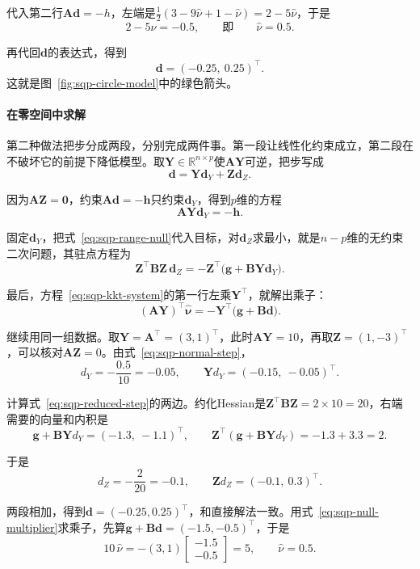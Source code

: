 代入第二行$\bm{A}\bm{d}=-h$，左端是$\frac12(3-9\hat\nu+1-\hat\nu)=2-5\hat\nu$，于是
\[
 2-5\hat\nu=-0.5,\qquad\text{即}\qquad\hat\nu=0.5.
\]

再代回$\bm{d}$的表达式，得到
\[
 \bm{d}=(-0.25,\ 0.25)^\top.
\]
这就是图~\ref{fig:sqp-circle-model}中的绿色箭头。

\paragraph{在零空间中求解}
第二种做法把步分成两段，分别完成两件事。第一段让线性化约束成立，第二段在不破坏它的前提下降低模型。取$\bm{Y}\in\mathbb{R}^{n\times p}$使$\bm{A}\bm{Y}$可逆，把步写成
\begin{equation}
 \bm{d}=\bm{Y}\bm{d}_Y+\bm{Z}\bm{d}_Z.
 \label{eq:sqp-range-null}
\end{equation}

因为$\bm{A}\bm{Z}=\bm{0}$，约束$\bm{A}\bm{d}=-\bm{h}$只约束$\bm{d}_Y$，得到$p$维的方程
\begin{equation}
 \bm{A}\bm{Y}\bm{d}_Y=-\bm{h}.
 \label{eq:sqp-normal-step}
\end{equation}

固定$\bm{d}_Y$，把式~\eqref{eq:sqp-range-null}代入目标，对$\bm{d}_Z$求最小，就是$n-p$维的无约束二次问题，其驻点方程为
\begin{equation}
 \bm{Z}^\top\bm{B}\bm{Z}\,\bm{d}_Z=-\bm{Z}^\top\bigl(\bm{g}+\bm{B}\bm{Y}\bm{d}_Y\bigr).
 \label{eq:sqp-reduced-step}
\end{equation}

最后，方程~\eqref{eq:sqp-kkt-system}的第一行左乘$\bm{Y}^\top$，就解出乘子：
\begin{equation}
 (\bm{A}\bm{Y})^\top\hat{\bm{\nu}}=-\bm{Y}^\top\bigl(\bm{g}+\bm{B}\bm{d}\bigr).
 \label{eq:sqp-null-multiplier}
\end{equation}

继续用同一组数据。取$\bm{Y}=\bm{A}^\top=(3,1)^\top$，此时$\bm{A}\bm{Y}=10$，再取$\bm{Z}=(1,-3)^\top$，可以核对$\bm{A}\bm{Z}=0$。由式~\eqref{eq:sqp-normal-step}，
\[
 d_Y=-\frac{0.5}{10}=-0.05,\qquad \bm{Y}d_Y=(-0.15,\ -0.05)^\top.
\]

计算式~\eqref{eq:sqp-reduced-step}的两边。约化Hessian是$\bm{Z}^\top\bm{B}\bm{Z}=2\times10=20$，右端需要的向量和内积是
\[
 \bm{g}+\bm{B}\bm{Y}d_Y=(-1.3,\ -1.1)^\top,\qquad
 \bm{Z}^\top(\bm{g}+\bm{B}\bm{Y}d_Y)=-1.3+3.3=2.
\]

于是
\[
 d_Z=-\frac{2}{20}=-0.1,\qquad \bm{Z}d_Z=(-0.1,\ 0.3)^\top.
\]

两段相加，得到$\bm{d}=(-0.25,0.25)^\top$，和直接解法一致。用式~\eqref{eq:sqp-null-multiplier}求乘子，先算$\bm{g}+\bm{B}\bm{d}=(-1.5,-0.5)^\top$，于是
\[
 10\,\hat\nu=-(3,1)\begin{bmatrix}-1.5\\-0.5\end{bmatrix}=5,\qquad\hat\nu=0.5.
\]

